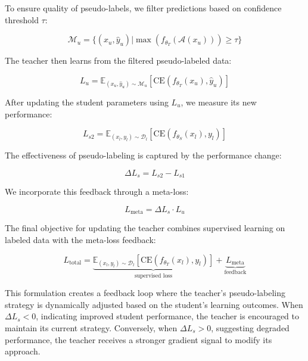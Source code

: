 To ensure quality of pseudo-labels, we filter predictions based on confidence threshold $\tau$:

\begin{equation}
\mathcal{M}_u = \{(x_u, \hat{y}_u) | \max(f_{\theta_T}(\mathcal{A}(x_u))) \geq \tau\}
\end{equation}

The teacher then learns from the filtered pseudo-labeled data:

\begin{equation}
L_u = \mathbb{E}_{(x_u,\hat{y}_u)\sim\mathcal{M}_u}[\text{CE}(f_{\theta_T}(x_u), \hat{y}_u)]
\end{equation}

After updating the student parameters using $L_u$, we measure its new performance:

\begin{equation}
L_{s2} = \mathbb{E}_{(x_l,y_l)\sim\mathcal{D}_l}[\text{CE}(f_{\theta_S}(x_l), y_l)]
\end{equation}

The effectiveness of pseudo-labeling is captured by the performance change:

\begin{equation}
\Delta L_s = L_{s2} - L_{s1}
\end{equation}

We incorporate this feedback through a meta-loss:

\begin{equation}
L_{\text{meta}} = \Delta L_s \cdot L_u
\end{equation}

The final objective for updating the teacher combines supervised learning on labeled data with the meta-loss feedback:

\begin{equation}
L_{\text{total}} = \underbrace{\mathbb{E}_{(x_l,y_l)\sim\mathcal{D}_l}[\text{CE}(f_{\theta_T}(x_l), y_l)]}_{\text{supervised loss}} + \underbrace{L_{\text{meta}}}_{\text{feedback}}
\end{equation}

This formulation creates a feedback loop where the teacher's pseudo-labeling strategy is dynamically adjusted based on the student's learning outcomes. When $\Delta L_s < 0$, indicating improved student performance, the teacher is encouraged to maintain its current strategy. Conversely, when $\Delta L_s > 0$, suggesting degraded performance, the teacher receives a stronger gradient signal to modify its approach.

